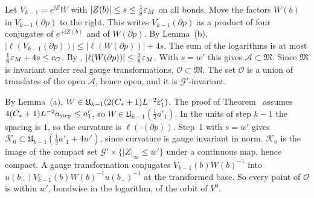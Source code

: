 \begin{detail}\label{d11a:A14b}
\begin{step}
Let $V_{k-1}=e^{\ii Z}W$ with $|Z(b)|\le s\le\frac18\varepsilon_M$ on all bonds. Move the factors $W(b)$ in $V_{k-1}(\partial p)$ to the right. This writes $V_{k-1}(\partial p)$ as a product of four conjugates of $e^{\pm\ii Z(b)}$ and of $W(\partial p)$. By Lemma~(b), $|\ell(V_{k-1}(\partial p))|\le|\ell(W(\partial p))|+4s$. The sum of the logarithms is at most $\frac18\varepsilon_M+4s\le c_G$. By , $|\ell(W(\partial p))|\le\frac18\varepsilon_M$. With $s=w'$ this gives $\mathscr A\subset\mathfrak M$. Since $\mathfrak M$ is invariant under real gauge transformations, $\mathscr O\subset\mathfrak M$. The set $\mathscr O$ is a union of translates of the open $\mathscr A$, hence open, and it is $\mathcal G'$-invariant.
\end{step}
\begin{step}
By Lemma~(a), $W\in\mathfrak U_{k-1}(2(C_*+1)L^{-2}\varepsilon'_1)$. The proof of Theorem~ assumes $4(C_*+1)L^{-2}a_{\rm step}\le a'_1$, so $W\in\mathfrak U_{k-1}(\frac12a'_1)$. In the units of step $k-1$ the spacing is $1$, so the curvature is $\ell(\cdot(\partial p))$. Step~1 with $s=w'$ gives $\mathcal K_0\subset\mathfrak U_{k-1}(\frac12a'_1+4w')$, since curvature is gauge invariant in norm. $\mathcal K_0$ is the image of the compact set $\mathcal G'\times\{|Z|_\infty\le w'\}$ under a continuous map, hence compact. A gauge transformation conjugates $V_{k-1}(b)W(b)^{-1}$ into $u(b_-)V_{k-1}(b)W(b)^{-1}u(b_-)^{-1}$ at the transformed base. So every point of $\mathscr O$ is within $w'$, bondwise in the logarithm, of the orbit of $V^0$.
\end{step}
\end{detail}


